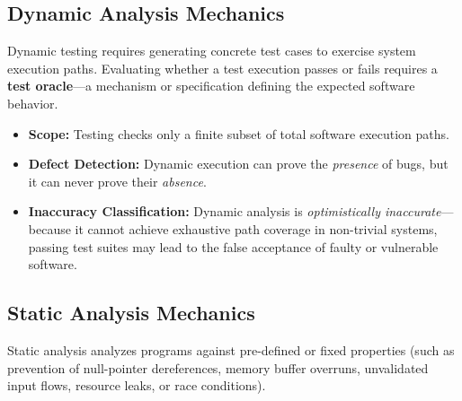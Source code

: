 \subsection{Dynamic Analysis Mechanics}
Dynamic testing requires generating concrete test cases to exercise system execution paths. Evaluating whether a test execution passes or fails requires a \textbf{test oracle}—a mechanism or specification defining the expected software behavior.

\begin{itemize}
    \item \textbf{Scope:} Testing checks only a finite subset of total software execution paths.
    \item \textbf{Defect Detection:} Dynamic execution can prove the \textit{presence} of bugs, but it can never prove their \textit{absence}.
    \item \textbf{Inaccuracy Classification:} Dynamic analysis is \textit{optimistically inaccurate}—because it cannot achieve exhaustive path coverage in non-trivial systems, passing test suites may lead to the false acceptance of faulty or vulnerable software.
\end{itemize}

\subsection{Static Analysis Mechanics}
Static analysis analyzes programs against pre-defined or fixed properties (such as prevention of null-pointer dereferences, memory buffer overruns, unvalidated input flows, resource leaks, or race conditions).

